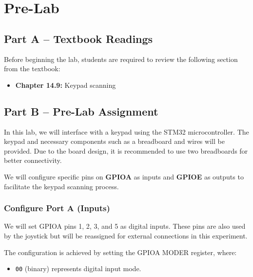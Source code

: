 \documentclass[12pt]{article}
\begin{document}
\section{Pre-Lab}
\label{sec:prelab}

\subsection{Part A – Textbook Readings}
Before beginning the lab, students are required to review the following section from the textbook:
\begin{itemize}
    \item \textbf{Chapter 14.9:} Keypad scanning
\end{itemize}

\subsection{Part B – Pre-Lab Assignment}
In this lab, we will interface with a keypad using the STM32 microcontroller. The keypad and necessary components such as a breadboard and wires will be provided. Due to the board design, it is recommended to use two breadboards for better connectivity.

We will configure specific pins on \textbf{GPIOA} as inputs and \textbf{GPIOE} as outputs to facilitate the keypad scanning process.

\subsubsection{ Configure Port A (Inputs)}
We will set GPIOA pins 1, 2, 3, and 5 as digital inputs. These pins are also used by the joystick but will be reassigned for external connections in this experiment.

The configuration is achieved by setting the GPIOA MODER register, where:
\begin{itemize}
    \item \texttt{00} (binary) represents digital input mode.
\end{itemize}

\bigskip
\end{document}
